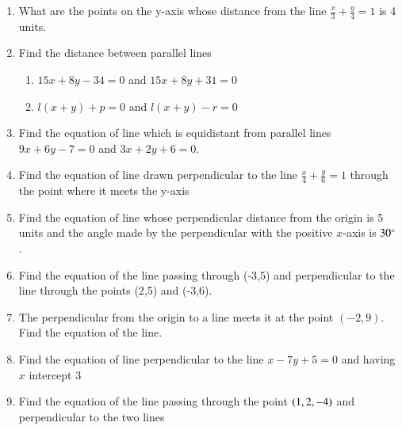 \begin{enumerate}[label=\thesubsection.\arabic*,ref=\thesubsection.\theenumi]
	\solution

\item What are the points on the y-axis whose distance from the line $\frac{x}{3}+\frac{y}{4}=1$ is 4 units.
\\
\solution
		
\item Find the distance between parallel lines
\label{chapters/11/10/3/6}
\begin{enumerate}
	\item $15x+8y-34=0$ and  $15x+8y+31=0$ \\
	\item  $l(x+y)+p=0$ and  $l(x+y)-r=0$
\end{enumerate}
	\solution

\item Find the equation of line which is equidistant from parallel lines $9x+6y-7=0$ and $3x+2y+6=0$.
\\
\solution
		
\item Find the equation of line  drawn perpendicular to the line $\frac{x}{4}+\frac{y}{6}=1$ through the point where it meets the y-axis \\
\solution
		
\item Find the equation of line whose perpendicular distance from the origin is 5 units and the angle made by the perpendicular with the positive $x$-axis is $30\degree$.
\label{chapters/11/10/2/8}
\\
\solution

\item 
	Find the equation of the line passing through  (-3,5) and perpendicular to the line through the points (2,5) and (-3,6).
	\\
	\solution 
\label{chapters/11/10/2/10}

\item 
	The perpendicular from the origin to a line meets it at the point $(-2,9)$. Find the equation of the line.
\label{chapters/11/10/2/15}
	\\
	\solution

\item Find the equation of line perpendicular to the line $x-7y+5=0$ and having $x$ intercept $3$\\
\label{chapters/11/10/3/8}
\solution

	\item Find the equation of the line passing through the point $\left(1,2,-4\right)$ and perpendicular to the two lines
\begin{align}

\end{align}
\end{enumerate}
